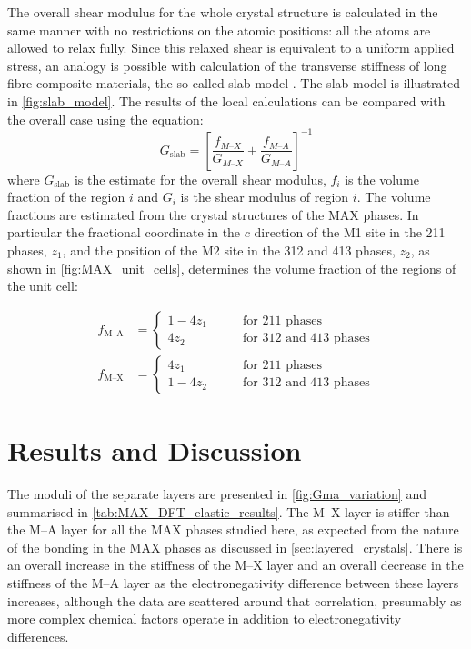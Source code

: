 

The overall shear modulus for the whole crystal structure is calculated in the same manner with no restrictions on the atomic positions: all the atoms are allowed to relax fully. Since this relaxed shear is equivalent to a uniform applied stress, an analogy is possible with calculation of the transverse stiffness of long fibre composite materials, the so called slab model \cite{Hull1996ch4}. The slab model is illustrated in \autoref{fig:slab_model}. The results of the local calculations can be compared with the overall case using the equation:
\begin{equation}
G_{\text{slab}} = \left[ \frac{f_{M\text{--}X}}{G_{M\text{--}X}} + \frac{f_{M\text{--}A}}{G_{M\text{--}A}} \right]^{-1} \label{eqn:slab_model}
\end{equation}
where $G_{\text{slab}}$ is the estimate for the overall shear modulus, $f_i$ is the volume fraction of the region $i$ and $G_i$ is the shear modulus of region $i$. The volume fractions are estimated from the crystal structures of the MAX phases. In particular the fractional coordinate in the $c$ direction of the M1 site in the 211 phases, $z_1$, and the position of the M2 site in the 312 and 413 phases, $z_2$, as shown in \autoref{fig:MAX_unit_cells}, determines the volume fraction of the regions of the unit cell:

\begin{subequations}
\begin{align}
f_{\text{M--A}} &= 
\begin{cases}
1-4z_1 & \qquad \text{for 211 phases} \\
4z_2 & \qquad \text{for 312 and 413 phases}
\end{cases}  \\[1ex]
f_{\text{M--X}} &= 
\begin{cases}
4z_1 & \qquad \text{for 211 phases} \\
1 - 4z_2 & \qquad \text{for 312 and 413 phases}
\end{cases}
\end{align}
\end{subequations}

\section{Results and Discussion}

The moduli of the separate layers are presented in \autoref{fig:Gma_variation} and summarised in \autoref{tab:MAX_DFT_elastic_results}. The M--X layer is stiffer than the M--A layer for all the MAX phases studied here, as expected from the nature of the bonding in the MAX phases as discussed in \autoref{sec:layered_crystals}. There is an overall increase in the stiffness of the M--X layer and an overall decrease in the stiffness of the M--A layer as the electronegativity difference between these layers increases, although the data are scattered around that correlation, presumably as more complex chemical factors operate in addition to electronegativity differences.


